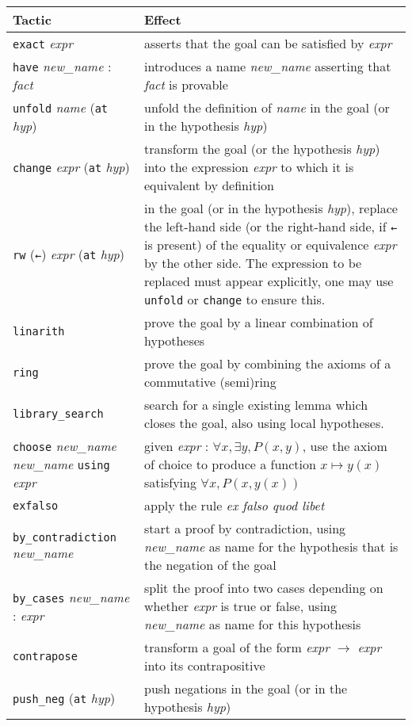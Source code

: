 \documentclass[a4paper]{article}
\newcommand{\lean}[1]{{\tt #1}}
\newcommand{\nv}{\textit{new\_name} }
\newcommand{\nom}{\textit{name} }
\newcommand{\expr}{\textit{expr} }
\newcommand{\fait}{\textit{fact} }
\newcommand{\hyp}{\textit{hyp}\xspace}
\begin{document}
\begin{center}
\setlength\tabcolsep{.5cm}
\def\arraystretch{1.6}
\begin{tabular}{@{}lp{10cm}@{}}
  \toprule
  Tactic & Effect \\
  \midrule
  \lean{exact} \expr & asserts that the goal can be satisfied by \expr \\
  \lean{have} \nv : \fait & introduces a name \nv asserting that \fait is provable \\
  \lean{unfold} \nom (\lean{at} \hyp) & unfold the definition of \nom in the goal
  (or in the hypothesis \hyp) \\
  \lean{change} \expr (\lean{at} \hyp) & transform the goal (or the hypothesis \hyp)
  into the expression \expr to which it is equivalent by definition \\
  \lean{rw} (\lean{←}) \expr (\lean{at} \hyp) & in the goal (or in the
  hypothesis \hyp), replace the left-hand side
  (or the right-hand side, if \lean{←} is present)
  of the equality or equivalence \expr by the other side.
  The expression to be replaced must appear explicitly,
  one may use \lean{unfold} or \lean{change} to ensure this. \\
  \lean{linarith} & prove the goal by a linear combination of hypotheses \\
  \lean{ring} & prove the goal by combining the axioms of a commutative (semi)ring \\
  \lean{library\_search} & search for a single existing lemma which closes the goal, also using local hypotheses. \\
  \lean{choose} \nv \nv \lean{using} \expr &
  given \expr : $\forall x, \exists y, P(x, y)$,
  use the axiom of choice to produce a function $x \mapsto y(x)$ satisfying
  $\forall x, P(x, y(x))$\\
  \lean{exfalso} & apply the rule \emph{ex falso quod libet} \\
  \lean{by\_contradiction} \nv & start a proof by contradiction,
  using \nv as name for the hypothesis that is the negation of the goal \\
  \lean{by\_cases} \nv : \expr & split the proof into two cases
  depending on whether \expr is true or false,
  using \nv as name for this hypothesis \\
  \lean{contrapose} & transform a goal of the form \expr $\to$ \expr
  into its contrapositive \\
  \lean{push\_neg} (\lean{at} \hyp) & push negations in the goal
  (or in the hypothesis \hyp) \\
  \bottomrule
\end{tabular}
\end{center}
\end{document}
